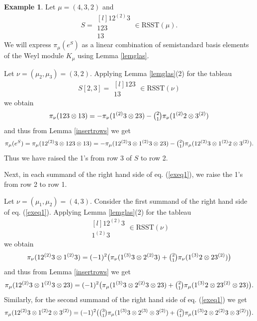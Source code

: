 \documentclass[11pt]{amsart}
\theoremstyle{definition}
\newtheorem{ex}[thm]{Example}
\numberwithin{equation}{section}
\begin{document}
\begin{ex}\label{ex} Let $\mu=(4,3,2)$ and \[ S=\begin{matrix*}[l]
		1 2^{(2)}3 \\
		123 \\
		13 \end{matrix*} \in \mathrm{RSST}(\mu).\] We will express $\pi_\mu(e^S)$ as a linear combination of semistandard basis elements of the Weyl module $K_\mu$ using Lemma \ref{lemglas}.
		
		Let $\nu=(\mu_2,\mu_3)=(3,2)$. Applying Lemma \ref{lemglas}(2) for the tableau \[ S[2,3]=\begin{matrix*}[l] 
			123 \\
			13 \end{matrix*} \in \mathrm{RSST}(\nu)\] we obtain \[ \pi_{\nu}(123 \otimes 13)=-\pi_{\nu}(1^{(2)}3 \otimes 23) - \tbinom{2}{1}\pi_{\nu}(1^{(2)}2 \otimes 3^{(2)}) 
		\]
		and thus from Lemma \ref{insertrows} we get \begin{equation}\label{exeq1} \pi_\mu(e^S)=\pi_{\mu}(1 2^{(2)}3 \otimes 123 \otimes 13)=-\pi_{\mu}(1 2^{(2)}3 \otimes 1^{(2)}3 \otimes 23) - \tbinom{2}{1}\pi_{\mu}(1 2^{(2)}3 \otimes 1^{(2)}2 \otimes 3^{(2)}). 
		\end{equation} Thus we have raised the 1's from  row 3 of $S$ to row 2. 
		
		Next, in each summand of the right hand side of eq. (\ref{exeq1}), we raise the 1's from row 2 to row 1. 
		
		Let $\nu=(\mu_1,\mu_2)=(4,3)$. Consider the first summand of the right hand side of eq. (\ref{exeq1}). Applying Lemma \ref{lemglas}(2) for the tableau \[ \begin{matrix*}[l] 
			12^{(2)}3 \\
			1^{(2)}3 \end{matrix*} \in \mathrm{RSST}(\nu)\] we obtain \[ \pi_{\nu}(12^{(2)}3 \otimes 1^{(2)}3 )=(-1)^2 \big( \pi_{\nu}(1^{(3)}3 \otimes 2^{(2)}3) + \tbinom{2}{1}\pi_{\nu}(1^{(3)}2 \otimes 23^{(2)})  \big)
		\]
		and thus from Lemma \ref{insertrows} we get \begin{equation}\label{exeq2} \pi_{\mu}(12^{(2)}3 \otimes 1^{(2)}3 \otimes 23)=(-1)^2 \big( \pi_{\mu}(1^{(3)}3 \otimes 2^{(2)}3 \otimes 23) + \tbinom{2}{1}\pi_{\mu}(1^{(3)}2 \otimes 23^{(2)}  \otimes 23) \big). \end{equation}
		Similarly, for the second summand of the right hand side of eq. (\ref{exeq1}) we get
		\begin{equation}\label{exeq3} \pi_{\mu}(12^{(2)}3 \otimes 1^{(2)}2 \otimes 3^{(2)})=(-1)^2 \big( \tbinom{3}{1}\pi_{\mu}(1^{(3)}3 \otimes 2^{(3)} \otimes 3^{(2)}) + \tbinom{2}{1}\pi_{\mu}(1^{(3)}2 \otimes 2^{(2)}3  \otimes 3^{(2)})  \big). \end{equation}
		

\end{ex}
\end{document}
